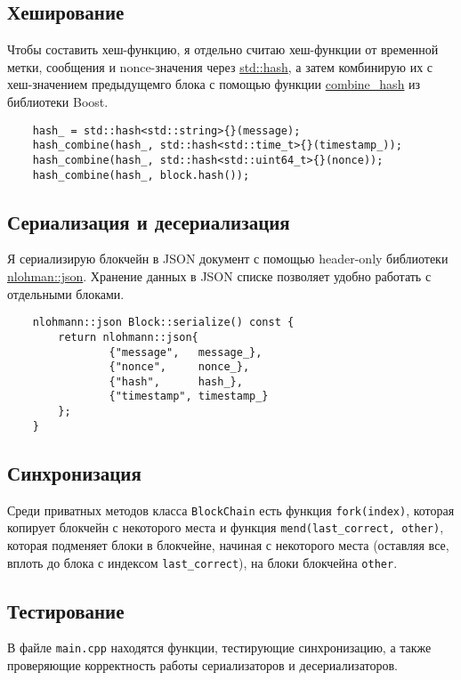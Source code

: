 \documentclass{article}
\begin{document}
\subsection{Хеширование}
Чтобы составить хеш-функцию, я отдельно считаю хеш-функции от временной метки, сообщения и nonce-значения через \href{https://en.cppreference.com/w/cpp/utility/hash}{std::hash}, а затем комбинирую их с хеш-значением предыдущемго блока с помощью функции \href{https://www.boost.org/doc/libs/1_74_0/boost/container_hash/hash.hpp}{combine\_hash} из библиотеки Boost.

\begin{lstlisting}
    hash_ = std::hash<std::string>{}(message);
    hash_combine(hash_, std::hash<std::time_t>{}(timestamp_));
    hash_combine(hash_, std::hash<std::uint64_t>{}(nonce));
    hash_combine(hash_, block.hash());
\end{lstlisting}

\subsection{Сериализация и десериализация}

Я сериализирую блокчейн в JSON документ с помощью header-only библиотеки \href{https://github.com/nlohmann/json}{nlohman::json}. Хранение данных в JSON списке позволяет удобно работать с отдельными блоками.

\begin{lstlisting}
    nlohmann::json Block::serialize() const {
        return nlohmann::json{
                {"message",   message_},
                {"nonce",     nonce_},
                {"hash",      hash_},
                {"timestamp", timestamp_}
        };
    }
\end{lstlisting}

\subsection{Синхронизация}
Среди приватных методов класса \texttt{BlockChain} есть функция \texttt{fork(index)}, которая копирует блокчейн с некоторого места и функция \texttt{mend(last\_correct, other)}, которая подменяет блоки в блокчейне, начиная с некоторого места (оставляя все, вплоть до блока с индексом \texttt{last\_correct}), на блоки блокчейна \texttt{other}.

\subsection{Тестирование}
В файле \texttt{main.cpp} находятся функции, тестирующие синхронизацию, а также проверяющие корректность работы сериализаторов и десериализаторов.
\end{document}
